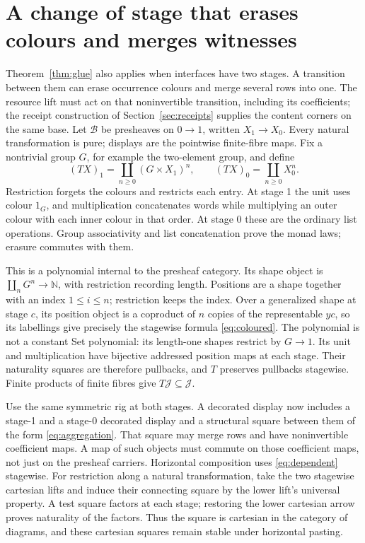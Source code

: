 \documentclass[11pt]{article}
\numberwithin{equation}{section}
\theoremstyle{definition}\newtheorem{definition}[theorem]{Definition}
\newcommand{\B}{\mathcal B}\newcommand{\J}{\mathcal J}
\begin{document}
\section{A change of stage that erases colours and merges witnesses}\label{sec:indexed}
Theorem~\ref{thm:glue} also applies when interfaces have two stages.
A transition between them can erase occurrence colours and merge several
rows into one. The resource lift must act on that noninvertible
transition, including its coefficients; the receipt construction of
Section~\ref{sec:receipts} supplies the content corners on the same base.
Let $\B$ be presheaves on $0\to1$, written
$X_1\to X_0$. Every natural transformation is pure; displays are the
pointwise finite-fibre maps. Fix a nontrivial group $G$, for example the
two-element group, and define
\begin{equation}\label{eq:coloured}
 (TX)_1=\coprod_{n\geq0}(G\times X_1)^n,
 \qquad (TX)_0=\coprod_{n\geq0}X_0^n.
\end{equation}
Restriction forgets the colours and restricts each entry. At stage 1 the
unit uses colour $1_G$, and multiplication concatenates words while
multiplying an outer colour with each inner colour in that order.
At stage 0 these are the ordinary list operations. Group associativity
and list concatenation prove the monad laws; erasure commutes with them.

This is a polynomial internal to the presheaf category. Its shape object
is $\coprod_nG^n\to\mathbb N$, with restriction recording length.
Positions are a shape together with an index $1\leq i\leq n$; restriction
keeps the index. Over a generalized shape at stage $c$, its position
object is a coproduct of $n$ copies of the representable $yc$, so its
labellings give precisely the stagewise formula \eqref{eq:coloured}.
The polynomial is not a constant Set polynomial: its length-one shapes
restrict by $G\to1$. Its unit and multiplication have bijective addressed
position maps at each stage. Their naturality squares are therefore
pullbacks, and $T$ preserves pullbacks stagewise. Finite products of
finite fibres give $T\J\subseteq\J$.

Use the same symmetric rig at both stages. A decorated display now
includes a stage-1 and a stage-0 decorated display and a structural
square between them of the form \eqref{eq:aggregation}. That square may
merge rows and have noninvertible coefficient maps. A map of such objects
must commute on those coefficient maps, not just on the presheaf carriers.
Horizontal composition uses \eqref{eq:dependent} stagewise.
For restriction along a natural transformation, take the two stagewise
cartesian lifts and induce their connecting square by the lower lift's
universal property. A test square factors at each stage; restoring the
lower cartesian arrow proves naturality of the factors. Thus the square
is cartesian in the category of diagrams, and these cartesian squares
remain stable under horizontal pasting.
\end{document}
